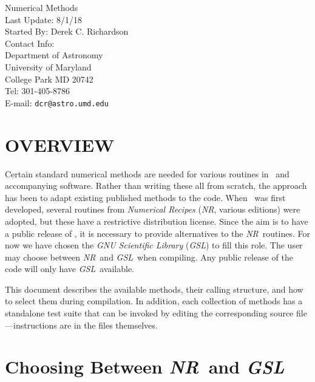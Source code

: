 

\newcommand{\nr}{\textit{NR}}
\newcommand{\gsl}{\textit{GSL}}



\begin{flushleft}
  \huge{Numerical Methods}\\
  \bigskip\bigskip
  \Large{Last Update: 8/1/18}\\
  \bigskip\bigskip
  \large{Started By: Derek C. Richardson}\\
  \bigskip
  \large{Contact Info:}\\
  Department of Astronomy\\
  University of Maryland\\
  College Park MD 20742\\
  Tel: 301-405-8786\\
  E-mail: \texttt{dcr@astro.umd.edu}
\end{flushleft}

\tableofcontents

\section{OVERVIEW}

Certain standard numerical methods are needed for various routines in
\pkd\ and accompanying software.  Rather than writing these all from
scratch, the approach has been to adapt existing published methods to
the code.  When \pkd\ was first developed, several routines from
\textit{Numerical Recipes} (\nr, various editions) were adopted, but
these have a restrictive distribution license.  Since the aim is to
have a public release of \pkd, it is necessary to provide alternatives
to the \nr\ routines.  For now we have chosen the \textit{GNU
  Scientific Library} (\gsl) to fill this role.  The user may choose
between \nr\ and \gsl\ when compiling.  Any public release of the code
will only have \gsl\ available.

This document describes the available methods, their calling
structure, and how to select them during compilation.  In addition,
each collection of methods has a standalone test suite that can be
invoked by editing the corresponding source file---instructions are in
the files themselves.

\section{Choosing Between \nr\ and \gsl}

